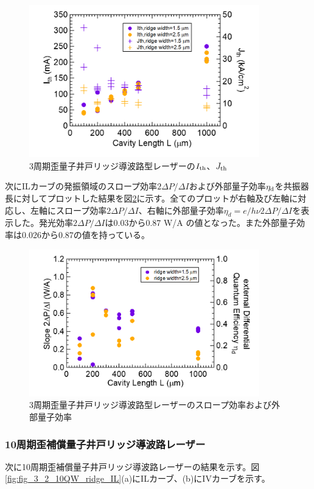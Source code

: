 {\begin{figure}[h]
	\centering
	\includegraphics[width=10cm]{figure/fig_3_2_3QW_ridge_Ith.png}
		\caption{3周期歪量子井戸リッジ導波路型レーザーの$I_{\rm{th}}$、$J_{\rm{th}}$}
		\label{fig:fig_3_2_3QW_ridge_Ith}
\end{figure}
次にILカーブの発振領域のスロープ効率$2 \Delta P/\Delta I$および外部量子効率$\eta_{\rm{d}}$を共振器長に対してプロットした結果を図\ref{fig:fig_3_2_3QW_ridge_slope}に示す。全てのプロットが右軸及び左軸に対応し、左軸にスロープ効率$2 \Delta P/\Delta I$、右軸に外部量子効率$\eta_{d}=e/h\nu2\Delta P/\Delta I$を表示した。発光効率$2 \Delta P/\Delta I$は0.03から0.87 W/A の値となった。また外部量子効率は0.026から0.87の値を持っている。
\begin{figure}[h]
	\centering
	\includegraphics[width=10cm]{figure/fig_3_2_3QW_ridge_slope.png}
		\caption{3周期歪量子井戸リッジ導波路型レーザーのスロープ効率および外部量子効率}
		\label{fig:fig_3_2_3QW_ridge_slope}
\end{figure}

\clearpage
\subsubsection{10周期歪補償量子井戸リッジ導波路レーザー}
次に10周期歪補償量子井戸リッジ導波路レーザーの結果を示す。図\ref{fig:fig_3_2_10QW_ridge_IL}(a)にILカーブ、(b)にIVカーブを示す。

}
